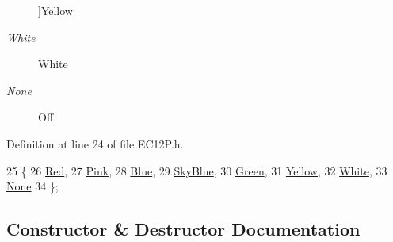 \begin{Desc}
\begin{description}
{}]Yellow \item[{\em 
\hypertarget{class_hardware_1_1_e_c12_p_a8341f410cd939bf03160fe239bc782aaacd1663fa4d06aa68eca32bbf370d9e15}{}White\label{class_hardware_1_1_e_c12_p_a8341f410cd939bf03160fe239bc782aaacd1663fa4d06aa68eca32bbf370d9e15}
}]White \item[{\em 
\hypertarget{class_hardware_1_1_e_c12_p_a8341f410cd939bf03160fe239bc782aaa0a40adb50c361b3ee3a6faca241d7c7a}{}None\label{class_hardware_1_1_e_c12_p_a8341f410cd939bf03160fe239bc782aaa0a40adb50c361b3ee3a6faca241d7c7a}
}]Off \end{description}
\end{Desc}


Definition at line 24 of file E\+C12\+P.\+h.


\begin{DoxyCode}
25         \{
26             \hyperlink{class_hardware_1_1_e_c12_p_a8341f410cd939bf03160fe239bc782aaa3b57c8754eb52c7023d81c7c45687f05}{Red},     
27             \hyperlink{class_hardware_1_1_e_c12_p_a8341f410cd939bf03160fe239bc782aaab5841c141282166e57407746841ff248}{Pink},       
28             \hyperlink{class_hardware_1_1_e_c12_p_a8341f410cd939bf03160fe239bc782aaa3f67a6d3b6004f86b8e4a477b3c5f915}{Blue},       
29             \hyperlink{class_hardware_1_1_e_c12_p_a8341f410cd939bf03160fe239bc782aaaac948b76451e5914627c3b482c5054c4}{SkyBlue}, 
30             \hyperlink{class_hardware_1_1_e_c12_p_a8341f410cd939bf03160fe239bc782aaafaadad2fea189e40df690d3bde44ac28}{Green},     
31             \hyperlink{class_hardware_1_1_e_c12_p_a8341f410cd939bf03160fe239bc782aaa25b4723962c85776a4ce70b8eee81263}{Yellow},       
32             \hyperlink{class_hardware_1_1_e_c12_p_a8341f410cd939bf03160fe239bc782aaacd1663fa4d06aa68eca32bbf370d9e15}{White},     
33             \hyperlink{class_hardware_1_1_e_c12_p_a8341f410cd939bf03160fe239bc782aaa0a40adb50c361b3ee3a6faca241d7c7a}{None}        
34         \};
\end{DoxyCode}


\subsection{Constructor \& Destructor Documentation}
\hypertarget{class_hardware_1_1_e_c12_p_a0b5c45d061ad98239e816e3845535d15}{}
